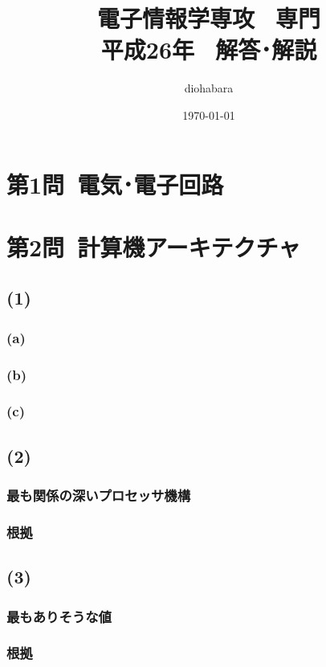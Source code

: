 \documentclass[a4paper,12pt,xelatex,ja=standard]{bxjsarticle}
\title{電子情報学専攻 \, 専門 \\ 平成26年 \, 解答･解説}
\author{diohabara}
\date{\today}
\begin{document}
\maketitle

\section*{第1問\ 電気･電子回路}

\section*{第2問\ 計算機アーキテクチャ}
\subsection*{(1)}
\subsubsection*{(a)}

\subsubsection*{(b)}

\subsubsection*{(c)}

\subsection*{(2)}
\subsubsection*{最も関係の深いプロセッサ機構}
\subsubsection*{根拠}

\subsection*{(3)}
\subsubsection*{最もありそうな値}
\subsubsection*{根拠}
\end{document}
